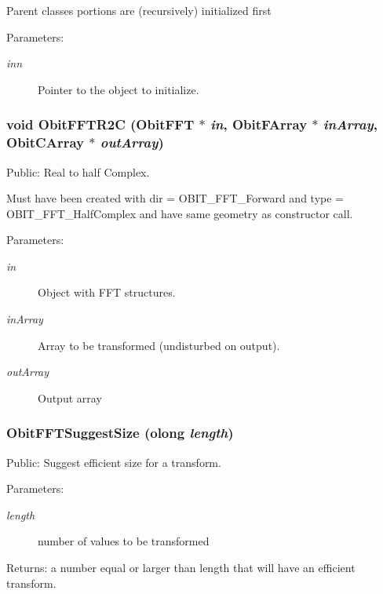 Parent classes portions are (recursively) initialized first \begin{Desc}
\item[Parameters:]
\begin{description}
\item[{\em inn}]Pointer to the object to initialize. \end{description}
\end{Desc}
\subsubsection{\setlength{\rightskip}{0pt plus 5cm}void Obit\-FFTR2C ({\bf Obit\-FFT} $\ast$ {\em in}, {\bf Obit\-FArray} $\ast$ {\em in\-Array}, {\bf Obit\-CArray} $\ast$ {\em out\-Array})}\label{ObitFFT_8c_a9}


Public: Real to half Complex. 

Must have been created with dir = OBIT\_\-FFT\_\-Forward and type = OBIT\_\-FFT\_\-Half\-Complex and have same geometry as constructor call. \begin{Desc}
\item[Parameters:]
\begin{description}
\item[{\em in}]Object with FFT structures. \item[{\em in\-Array}]Array to be transformed (undisturbed on output). \item[{\em out\-Array}]Output array \end{description}
\end{Desc}
\subsubsection{ Obit\-FFTSuggest\-Size ({\bf olong} {\em length})}\label{ObitFFT_8c_a8}


Public: Suggest efficient size for a transform. 

\begin{Desc}
\item[Parameters:]
\begin{description}
\item[{\em length}]number of values to be transformed \end{description}
\end{Desc}
\begin{Desc}
\item[Returns:]a number equal or larger than length that will have an efficient transform. \end{Desc}
